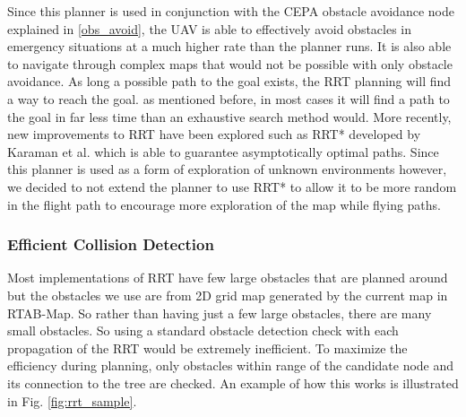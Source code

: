 \documentclass[letterpaper, 10 pt, conference]{ieeeconf}  %
\begin{document}
Since this planner is used in conjunction with the CEPA obstacle avoidance node explained in \ref{obs_avoid}, the UAV is able to effectively avoid obstacles in emergency situations at a much higher rate than the planner runs. It is also able to navigate through complex maps that would not be possible with only obstacle avoidance. As long a possible path to the goal exists, the RRT planning will find a way to reach the goal. as mentioned before, in most cases it will find a path to the goal in far less time than an exhaustive search method would. More recently, new improvements to RRT have been explored such as RRT* developed by Karaman et al. \cite{Karaman2011} which is able to guarantee asymptotically optimal paths. Since this planner is used as a form of exploration of unknown environments however, we decided to not extend the planner to use RRT* to allow it to be more random in the flight path to encourage more exploration of the map while flying paths.

\subsubsection{Efficient Collision Detection}
Most implementations of RRT have few large obstacles that are planned around but the obstacles we use are from 2D grid map generated by the current map in RTAB-Map. So rather than having just a few large obstacles, there are many small obstacles. So using a standard obstacle detection check with each propagation of the RRT would be extremely inefficient. To maximize the efficiency during planning, only obstacles within range of the candidate node and its connection to the tree are checked. An example of how this works is illustrated in Fig. \ref{fig:rrt_sample}.
\end{document}

